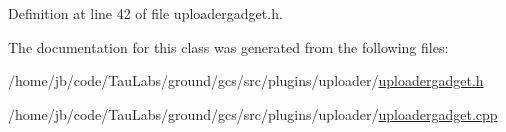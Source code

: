 \-Definition at line 42 of file uploadergadget.\-h.



\-The documentation for this class was generated from the following files\-:\begin{DoxyCompactItemize}
\item 
/home/jb/code/\-Tau\-Labs/ground/gcs/src/plugins/uploader/\hyperlink{uploadergadget_8h}{uploadergadget.\-h}\item 
/home/jb/code/\-Tau\-Labs/ground/gcs/src/plugins/uploader/\hyperlink{uploadergadget_8cpp}{uploadergadget.\-cpp}\end{DoxyCompactItemize}
